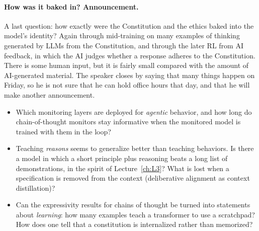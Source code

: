 \paragraph{How was it baked in? Announcement.}
A last question: how exactly were the Constitution and the ethics baked into the model's identity? Again through mid-training on many examples of thinking generated by LLMs from the Constitution, and through the later RL from AI feedback, in which the AI judges whether a response adheres to the Constitution. There is some human input, but it is fairly small compared with the amount of AI-generated material. The speaker closes by saying that many things happen on Friday, so he is not sure that he can hold office hours that day, and that he will make another announcement.

\begin{openq}
\begin{itemize}
  \item Which monitoring layers are deployed for \emph{agentic} behavior, and how long do chain-of-thought monitors stay informative when the monitored model is trained with them in the loop?
  \item Teaching \emph{reasons} seems to generalize better than teaching behaviors. Is there a model in which a short principle plus reasoning beats a long list of demonstrations, in the spirit of Lecture~\ref{ch:L3}? What is lost when a specification is removed from the context (deliberative alignment as context distillation)?
  \item Can the expressivity results for chains of thought be turned into statements about \emph{learning}: how many examples teach a transformer to use a scratchpad? How does one tell that a constitution is internalized rather than memorized?
\end{itemize}
\end{openq}

